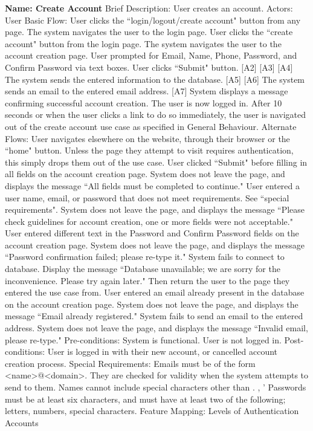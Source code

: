 \begin{outline}[enumerate]
\1 {\bf Name: Create Account}
\2 Brief Description: User creates an account.
\2 Actors: User
\2 Basic Flow:
\3 User clicks the ``login/logout/create account" button from any page.
\3 The system navigates the user to the login page.
\3 User clicks the ``create account" button from the login page.
\3 The system navigates the user to the account creation page.
\3 User prompted for Email, Name, Phone, Password, and Confirm Password via text boxes.
\3 User clicks ``Submit" button. [A2] [A3] [A4]
\3 The system sends the entered information to the database. [A5] [A6]
\3 The system sends an email to the entered email address. [A7]
\3 System displays a message confirming successful account creation.  The user is now logged in.
\3 After 10 seconds or when the user clicks a link to do so immediately, the user is navigated out of the create account use case as specified in General Behaviour.
\2 Alternate Flows:
\3 [A1] User navigates elsewhere on the website, through their browser or the ``home" button.  Unless the page they attempt to visit requires authentication, this simply drops them out of the use case.
\3 [A2] User clicked ``Submit" before filling in all fields on the account creation page.  System does not leave the page, and displays the message ``All fields must be completed to continue."
\3 [A3] User entered a user name, email, or password that does not meet requirements.  See ``special requirements".  System does not leave the page, and displays the message ``Please check guidelines for account creation, one or more fields were not acceptable."
\3 [A4] User entered different text in the Password and Confirm Password fields on the account creation page.  System does not leave the page, and displays the message ``Password confirmation failed; please re-type it."
\3 [A5] System fails to connect to database.  Display the message ``Database unavailable; we are sorry for the inconvenience.  Please try again later."  Then return the user to the page they entered the use case from.
\3 [A6] User entered an email already present in the database on the account creation page.  System does not leave the page, and displays the message ``Email already registered."
\3 [A7] System fails to send an email to the entered address.  System does not leave the page, and displays the message ``Invalid email, please re-type."
\2 Pre-conditions:
\3 System is functional.
\3 User is not logged in.
\2 Post-conditions:
\3 User is logged in with their new account, or cancelled account creation process.
\2 Special Requirements:
\3 Emails must be of the form {\textless}name{\textgreater}@{\textless}domain{\textgreater}.  They are checked for validity when the system attempts to send to them.
\3 Names cannot include special characters other than . , '
\3 Passwords must be at least six characters, and must have at least two of the following; letters, numbers, special characters.
\2 Feature Mapping:
\3 Levels of Authentication
\3 Accounts
\end{outline}

